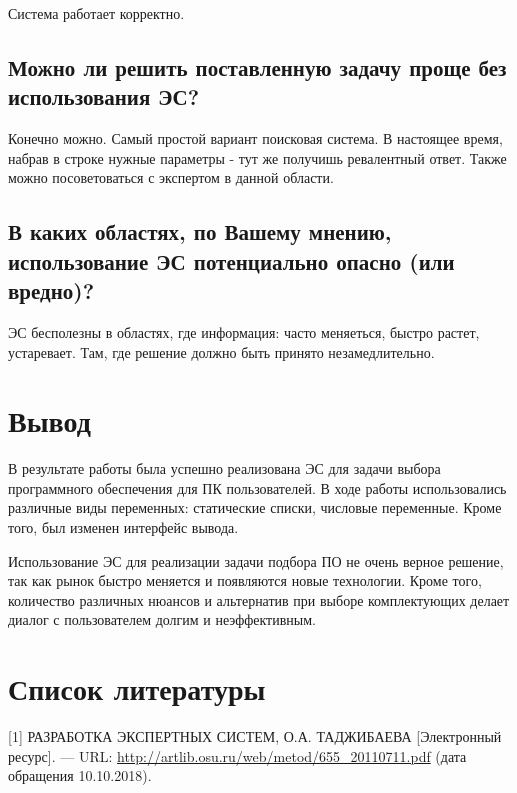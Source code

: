 \documentclass[14pt,a4paper,report]{report}
\begin{document}
 Система работает корректно.


\subsection{Можно ли решить поставленную задачу проще без использования ЭС?}

Конечно можно. Самый простой вариант поисковая система. В настоящее время, набрав в строке нужные параметры - тут же получишь ревалентный ответ. Также можно посоветоваться с экспертом в данной области.

\subsection{В каких областях, по Вашему мнению, использование ЭС потенциально опасно (или вредно)?}
ЭС бесполезны в областях, где информация: часто меняеться, быстро растет, устаревает. Там, где решение должно быть принято незамедлительно.



\section{Вывод}

В результате работы была успешно реализована ЭС для задачи выбора программного обеспечения для ПК пользователей. В ходе работы использовались различные виды переменных: статические списки, числовые переменные. Кроме того, был изменен интерфейс вывода.

Использование ЭС для реализации задачи подбора ПО не очень верное решение, так как рынок быстро меняется и появляются новые технологии. Кроме того, количество различных нюансов и альтернатив при выборе комплектующих делает диалог с пользователем долгим и неэффективным.

\section{Список литературы}


\begin{flushleft}
	
[1] РАЗРАБОТКА ЭКСПЕРТНЫХ СИСТЕМ, О.А. ТАДЖИБАЕВА [Электронный ресурс]. — URL: \href{http://artlib.osu.ru/web/metod/655_20110711.pdf}{http://artlib.osu.ru/web/metod/655\_20110711.pdf} (дата обращения 10.10.2018). \linebreak

\end{flushleft}
	
\end{document}
